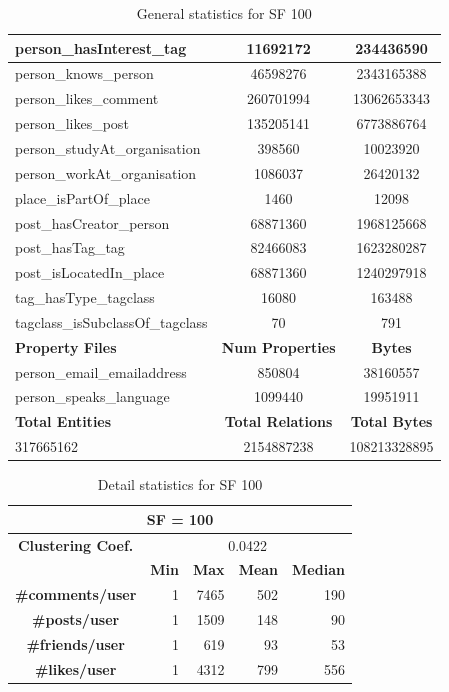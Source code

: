 \begin{table}[H]
\begin{tabular} {| l | c | c |}
        \hline
        person\_hasInterest\_tag & 11692172 & 234436590 \\
        \hline
        person\_knows\_person & 46598276 & 2343165388 \\
        \hline
        person\_likes\_comment & 260701994 & 13062653343 \\
        \hline
        person\_likes\_post & 135205141 & 6773886764 \\
        \hline
        person\_studyAt\_organisation & 398560 & 10023920 \\
        \hline
        person\_workAt\_organisation & 1086037 & 26420132 \\
        \hline
        place\_isPartOf\_place & 1460 & 12098 \\
        \hline
        post\_hasCreator\_person & 68871360 & 1968125668 \\
        \hline
        post\_hasTag\_tag & 82466083 & 1623280287 \\
        \hline
        post\_isLocatedIn\_place & 68871360 & 1240297918 \\
        \hline
        tag\_hasType\_tagclass & 16080 & 163488 \\
        \hline
        tagclass\_isSubclassOf\_tagclass & 70 & 791 \\
        \hline
        \hline
        \textbf{Property Files} & \textbf{Num Properties} & \textbf{Bytes} \\
        \hline
        \hline
        person\_email\_emailaddress & 850804 & 38160557 \\
        \hline
        person\_speaks\_language & 1099440 & 19951911 \\
        \hline
        \hline
        \textbf{Total Entities} & \textbf{Total Relations} & \textbf{Total Bytes} \\
        \hline
        \hline
         317665162 & 2154887238 & 108213328895 \\
        \hline
    \end{tabular}
    \caption{General statistics for SF 100}
\end{table}

\begin{table}[H]
\centering
\begin{tabular}{|c||r|r|r|r|}
\hline    \multicolumn{5}{|c|}{SF = 100 }  \\
\hline   \textbf{Clustering Coef.} &   \multicolumn{4}{|c|}{0.0422} \\
                            \hline & \textbf{Min} & \textbf{Max} & \textbf{Mean} & \textbf{Median}   \\
 \hline  \textbf{\#comments/user}  &1 &  7465 & 502 & 190 \\
    \hline  \textbf{\#posts/user}  &1 &  1509 & 148 & 90 \\
  \hline  \textbf{\#friends/user}  &1 &  619 & 93 & 53 \\
    \hline  \textbf{\#likes/user}  &1 &  4312 & 799 & 556 \\
\hline
\end{tabular}
\caption{Detail statistics for SF 100}
\end{table}

